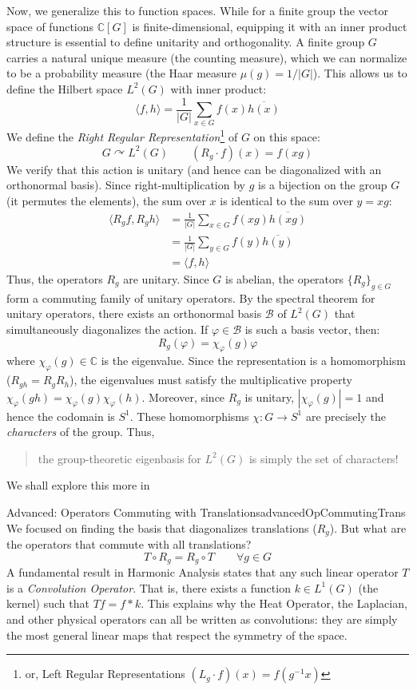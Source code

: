 \documentclass{article}
\newcommand{\C}{{\mathbb{C}}}
\renewcommand{\phi}{\varphi}
\newcommand{\actson}{\curvearrowright}
\let\temp\phi
\let\phi\varphi
\let\varphi\temp
\begin{document}
Now, we generalize this to function spaces. While for a finite group the vector space of functions $\C[G]$ is
finite-dimensional, equipping it with an inner product structure is essential to define unitarity and
orthogonality. A finite group $G$ carries a natural unique measure (the counting measure), which we can
normalize to be a probability measure (the Haar measure $\mu(g) = 1/|G|$). This allows us to define the
Hilbert space $L^2(G)$ with inner product:
\[
    \langle f, h \rangle = \frac{1}{|G|} \sum_{x \in G} f(x)\overline{h(x)}
\]
We define the \emph{Right Regular Representation}\footnote{or, Left Regular
Representations $(L_g\cdot f)(x) = f(g^{-1}x)$} of $G$ on this space:
\[
	G \actson L^2(G) \qquad (R_g \cdot f)(x) = f(xg)
\]
We verify that this action is unitary (and hence can be diagonalized with an orthonormal basis). Since
right-multiplication by $g$ is a bijection on the group $G$ (it permutes the elements), the sum over $x$ is
identical to the sum over $y = xg$:
\begin{align*}
    \langle R_g f, R_g h \rangle &= \frac{1}{|G|} \sum_{x \in G} f(xg)\overline{h(xg)} \\
    &= \frac{1}{|G|} \sum_{y \in G} f(y)\overline{h(y)} \\
    &= \langle f, h \rangle
\end{align*}
Thus, the operators $R_g$ are unitary. Since $G$ is abelian, the operators $\{R_g\}_{g \in G}$ form a
commuting family of unitary operators. By the spectral theorem for unitary operators, there exists an
orthonormal basis $\mathcal{B}$ of $L^2(G)$ that simultaneously diagonalizes the action.
If $\phi \in \mathcal{B}$ is such a basis vector, then:
\[
	R_g(\phi) = \chi_{\phi}(g)\phi
\]
where $\chi_{\phi}(g) \in \C$ is the eigenvalue. Since the representation is a homomorphism ($R_{gh} = R_g
R_h$), the eigenvalues must satisfy the multiplicative property $\chi_\phi(gh) = \chi_\phi(g)\chi_\phi(h)$.
Moreover, since $R_g$ is unitary, $|\chi_\phi(g)|=1$ and hence the codomain is $S^1$. These homomorphisms
$\chi: G \to S^1$ are precisely the \emph{characters} of the group. Thus,

\begin{quote}
	the group-theoretic eigenbasis for $L^2(G)$ is simply the set of characters!
\end{quote}

We shall explore this more in~\cite{NateRealAnalysis}

\begin{titledBox}{Advanced: Operators Commuting with Translations}{advancedOpCommutingTrans}
    We focused on finding the basis that diagonalizes translations ($R_g$). But what are the operators that
    commute with all translations?
    \[ T \circ R_g = R_g \circ T \qquad \forall g \in G \]
    A fundamental result in Harmonic Analysis states that any such linear operator $T$ is a \emph{Convolution Operator}.
    That is, there exists a function $k \in L^1(G)$ (the kernel) such that $Tf = f * k$.
    This explains why the Heat Operator, the Laplacian, and other physical operators can all be written as convolutions:
    they are simply the most general linear maps that respect the symmetry of the space.
\end{titledBox}
\end{document}
